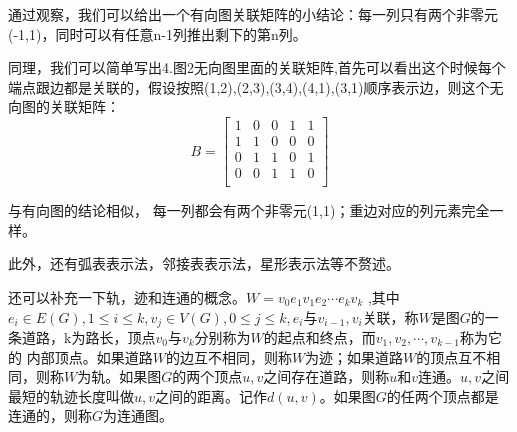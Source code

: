 \documentclass[a4paper,20pt]{article}
\begin{document}
\par \noindent 通过观察，我们可以给出一个有向图关联矩阵的小结论：每一列只有两个非零元(-1,1)，同时可以有任意n-1列推出剩下的第n列。
\par  同理，我们可以简单写出4.图2无向图里面的关联矩阵,首先可以看出这个时候每个端点跟边都是关联的，假设按照(1,2),(2,3),(3,4),(4,1),(3,1)顺序表示边，则这个无向图的关联矩阵：
$$B=\begin{bmatrix}
        1 & 0 & 0 & 1 & 1 \\
        1 & 1 & 0 & 0 & 0 \\
        0 & 1 & 1 & 0 & 1 \\
        0 & 0 & 1 & 1 & 0 \\
    \end{bmatrix}$$
\par \noindent 与有向图的结论相似， 每一列都会有两个非零元(1,1)；重边对应的列元素完全一样。
\par 此外，还有弧表表示法，邻接表表示法，星形表示法等不赘述。
\par 还可以补充一下轨，迹和连通的概念。$W=v_0e_1v_1e_2\cdots e_kv_k$ ,其中$e_i\in E(G),1\leq i\leq k,v_j\in V(G),0\leq j \leq k,e_i\mbox{与}v_{i-1},v_i$关联，称$W$是图$G$的一条道路，k为路长，顶点$v_0\mbox{与}v_k$分别称为$W$的起点和终点，而$v_1,v_2,\cdots,v_{k-1}$称为它的
内部顶点。如果道路$W$的边互不相同，则称$W$为迹；如果道路$W$的顶点互不相同，则称$W$为轨。如果图$G$的两个顶点$u,v$之间存在道路，则称$u\mbox{和}v$连通。$u,v$之间最短的轨迹长度叫做$u,v$之间的距离。记作$d(u,v)$。如果图$G$的任两个顶点都是连通的，则称$G$为连通图。
\end{document}
